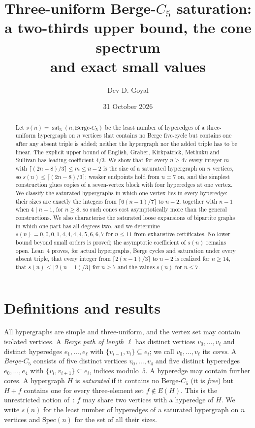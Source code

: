 \documentclass[11pt]{article}
\title{\textbf{Three-uniform Berge-$C_5$ saturation:\\ a two-thirds upper bound, the cone spectrum\\ and exact small values}}
\author{Dev D. Goyal}
\date{31 October 2026}
\theoremstyle{remark}
\newcommand{\sat}{\operatorname{sat}}
\begin{document}
\maketitle
\begin{abstract}
Let $s(n)=\sat_3(n,\text{Berge-}C_5)$ be the least number of hyperedges of
a three-uniform hypergraph on $n$ vertices that contains no Berge
five-cycle but contains one after any absent triple is added; neither the
hypergraph nor the added triple has to be linear. The explicit upper bound
of English, Graber, Kirkpatrick, Methuku and Sullivan has leading
coefficient $4/3$. We show that for every $n\ge47$ every integer $m$ with
$\lceil(2n-8)/3\rceil\le m\le n-2$ is the size of a saturated hypergraph on
$n$ vertices, so $s(n)\le\lceil(2n-8)/3\rceil$; weaker endpoints hold from
$n=7$ on, and the simplest construction glues copies of a seven-vertex
block with four hyperedges at one vertex. We classify the saturated
hypergraphs in which one vertex lies in every hyperedge: their sizes are
exactly the integers from $\lceil6(n-1)/7\rceil$ to $n-2$, together with
$n-1$ when $4\mid n-1$, for $n\ge8$, so such cones cost asymptotically more
than the general constructions. We also characterise the saturated loose
expansions of bipartite graphs in which one part has all degrees two, and
we determine $s(n)=0,0,0,1,4,4,4,4,5,6,6,7$ for $n\le11$ from exhaustive
certificates. No lower bound beyond small orders is proved; the
asymptotic coefficient of $s(n)$ remains open. Lean~4 proves, for actual
hypergraphs, Berge cycles and saturation under every absent triple, that
every integer from $\lceil2(n-1)/3\rceil$ to $n-2$ is realized for $n\ge14$,
that $s(n)\le\lceil2(n-1)/3\rceil$ for $n\ge7$ and the values $s(n)$ for
$n\le7$.
\end{abstract}

\section{Definitions and results}

All hypergraphs are simple and three-uniform, and the vertex set may
contain isolated vertices. A \emph{Berge path of length $\ell$} has
distinct vertices $v_0,\dots,v_\ell$ and distinct hyperedges
$e_1,\dots,e_\ell$ with $\{v_{i-1},v_i\}\subseteq e_i$; we call
$v_0,\dots,v_\ell$ its \emph{cores}. A \emph{Berge-$C_5$} consists of five
distinct vertices $v_0,\dots,v_4$ and five distinct hyperedges
$e_0,\dots,e_4$ with $\{v_i,v_{i+1}\}\subseteq e_i$, indices modulo~$5$. A
hyperedge may contain further cores. A hypergraph $H$ is \emph{saturated}
if it contains no Berge-$C_5$ (it is \emph{free}) but $H+f$ contains one
for every three-element set $f\notin E(H)$. This is the unrestricted
notion of~\cite{EGKMS}: $f$ may share two vertices with a hyperedge of $H$.
We write $s(n)$ for the least number of hyperedges of a saturated
hypergraph on $n$ vertices and $\mathrm{Spec}(n)$ for the set of all their
sizes.
\end{document}
